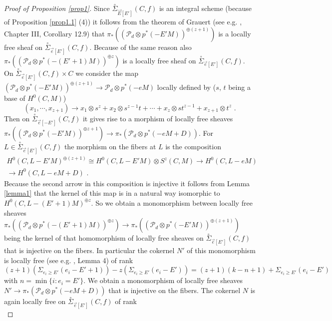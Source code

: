 \documentclass{article}
\theoremstyle{definition}
\theoremstyle{remark}
\begin{document}
\begin{proof}[Proof of Proposition \ref{prop1}]
Since $\overset {\circ}{\Sigma}_{\overrightarrow {E}[E']}(C,f)$ is an integral scheme (because of Proposition \ref{prop1.1} (4)) it follows from the theorem of Grauert (see e.g. \cite {ref1}, Chapter III, Corollary 12.9) that $\pi_*((\mathcal{P}_d \otimes p^*(-E'M))^{\oplus (z+1)})$ is a locally free sheaf on $\overset {\circ}{\Sigma}_{\overrightarrow {e}[E']}(C,f)$.
Because of the same reason also $\pi_*((\mathcal{P}_d \otimes p^*(-(E'+1)M))^{\oplus z})$ is a locally free sheaf on $\overset {\circ}{\Sigma}_{\overrightarrow {e}[E']}(C,f)$.
On $\overset {\circ}{\Sigma}_{\overrightarrow {e}[E']}(C,f) \times C$ we consider the map $(\mathcal{P}_d\otimes p^*(-E'M))^{\oplus (z+1)} \rightarrow \mathcal{P}_d \otimes p^*(-eM)$ locally defined by ($s$, $t$ being a base of $H^0(C,M)$)
\[
(x_1, \cdots , x_{z+1}) \rightarrow x_1 \otimes s^z+x_2 \otimes s^{z-1}t + \cdots + x_z \otimes st^{z-1}+x_{z+1} \otimes t^z \text { .}
\]
Then on $\overset {\circ}{\Sigma}_{\overrightarrow {e}[-E']}(C,f)$ it gives rise to a morphism of locally free sheaves $\pi_* ((\mathcal{P}_d \otimes p^*(-E'M))^{\oplus {z+1}}) \rightarrow \pi_* (\mathcal {P}_d\otimes p^*(-eM+D))$.
For $L \in \overset {\circ}{\Sigma}_{\overrightarrow {e}[E']}(C,f)$ the morphism on the fibers at $L$ is the composition
\begin{multline*}
H^0(C,L-E'M)^{\oplus (z+1)} \cong H^0(C,L-E'M)\otimes S^z(C,M) \rightarrow H^0(C,L-eM)\\
 \rightarrow H^0(C,L-eM+D) \text { .}
\end{multline*}
Because the second arrow in this composition is injective it follows from Lemma \ref{lemma1} that the kernel of this map is in a natural way isomorphic to $H^0(C,L-(E'+1)M)^{\oplus z}$.
So  we obtain a monomorphism between locally free sheaves $\pi_*((\mathcal{P}_d\otimes p^*(-(E'+1)M))^{\oplus z}) \rightarrow \pi_* ((\mathcal{P}_d \otimes p^*(-E'M))^{\oplus (z+1)})$ being the kernel of that homomorphism of locally free sheaves on $\overset {\circ}{\Sigma}_{\overrightarrow {e}[E']}(C,f)$ that is injective on the fibers.
In particular the cokernel $N'$ of this monomorphism is locally free (see e.g. \cite{ref2}, Lemma 4) of rank
\[
(z+1)(\Sigma_{e_i \geq E'} (e_i-E'+1))-z(\Sigma _{e_i \geq E'}(e_i-E'))=(z+1)(k-n+1)+\Sigma _{e_i \geq E'}(e_i-E')
\]
with $n=\min \{i : e_i=E' \}$.
We obtain a monomorphism of locally free sheaves $N' \rightarrow \pi _*(\mathcal {P}_d \otimes p^*(-eM+D))$ that is injective on the fibers.
The cokernel $N$ is again locally free on $\overset {\circ}{\Sigma}_{\overrightarrow {e}[E']}(C,f)$ of rank
\[
\]
\end{proof}
\end{document}
